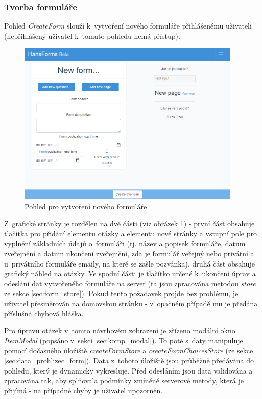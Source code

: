 		\subsubsection{Tvorba formuláře}\label{sec:pohled_tvorba_formulare} %
		Pohled \textit{CreateForm} slouží k~vytvoření nového formuláře přihlášenému uživateli (nepřihlášený uživatel k~tomuto pohledu nemá přístup). 
		
		\begin{figure}[h]
			\centering
			\includegraphics[width=0.95\textwidth]{img/pohledy/createform.png}
			\caption{Pohled pro vytvoření nového formuláře}
			\label{fig:pohled_createform}
		\end{figure}
		
		Z~grafické stránky je rozdělen na dvě části (viz obrázek \ref{fig:pohled_createform}) - první část obsahuje tlačítka pro přidání elementu otázky a elementu nové stránky a vstupní pole pro vyplnění základních údajů o~formuláři (tj. název a popisek formuláře, datum zveřejnění a datum ukončení zveřejnění, zda je formulář veřejný nebo privátní a u~privátního formuláře emaily, na které se zašle pozvánka), druhá část obsahuje grafický náhled na otázky. Ve spodní části je tlačítko určené k~ukončení úprav a odeslání dat vytvořeného formuláře na server (ta jsou zpracována metodou \textit{store} ze sekce \ref{sec:form_store}). Pokud tento požadavek projde bez problému, je uživatel přesměrován na domovskou stránku - v~opačném případě mu je předána příslušná chybová hláška.
		
		Pro úpravu otázek v~tomto návrhovém zobrazení je zřízeno modální okno \textit{ItemModal} (popsáno v~sekci \ref{sec:komp_modal}). To poté s~daty manipuluje pomocí dočasného úložiště \textit{createFormStore} a \textit{createFormChoicesStore} (ze sekce \ref{sec:data_prohlizec_form}). Data z~tohoto úložiště jsou průběžně předávána do pohledu, který je dynamicky vykresluje. Před odesláním jsou data validována a zpracována tak, aby splňovala podmínky zmíněné serverové metody, která je přijímá - na případné chyby je uživatel upozorněn.
		
